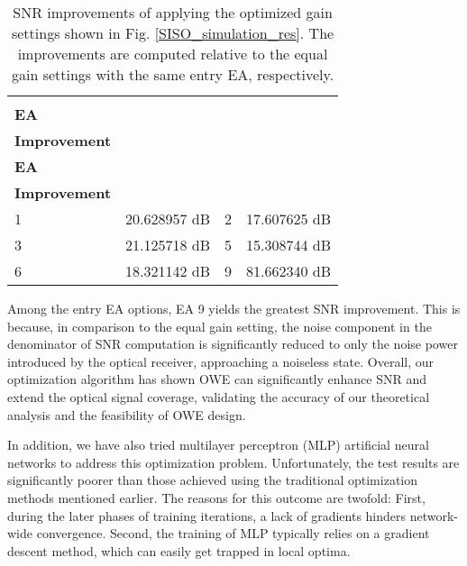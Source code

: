 \begin{table}
\centering
\begin{tabularx}{0.48\textwidth}{p{1.5cm}l|p{1.5cm}l}
\toprule
\begin{tabular}[c]{@{}l@{}} \textbf{Entry} \\ \textbf{EA} \end{tabular} & \begin{tabular}[c]{@{}l@{}} \textbf{SNR} \\ \textbf{Improvement} \quad \quad \quad \end{tabular} & \begin{tabular}[c]{@{}l@{}} \textbf{Entry} \\ \textbf{EA} \end{tabular} & \begin{tabular}[c]{@{}l@{}} \textbf{SNR} \\ \textbf{Improvement} \end{tabular} \\ \midrule
1           & 20.628957 dB    & 2           & 17.607625 dB    \\
3           & 21.125718 dB    & 5           & 15.308744 dB    \\
6           & 18.321142 dB    & 9           & 81.662340 dB    \\ \bottomrule
\end{tabularx}
\caption{SNR improvements of applying the optimized gain settings shown in Fig. \ref{SISO_simulation_res}. The improvements are computed relative to the equal gain settings with the same entry EA, respectively.}
\label{snr_improvement}
\vspace{-0.4cm}
\end{table}
\par
Among the entry EA options, EA 9 yields the greatest SNR improvement. This is because, in comparison to the equal gain setting, the noise component in the denominator of SNR computation is significantly reduced to only the noise power introduced by the optical receiver, approaching a noiseless state.
Overall, our optimization algorithm has shown OWE can significantly enhance SNR and extend the optical signal coverage, validating the accuracy of our theoretical analysis and the feasibility of OWE design.
\par
In addition, we have also tried multilayer perceptron (MLP) artificial neural networks to address this optimization problem. Unfortunately, the test results are significantly poorer than those achieved using the traditional optimization methods mentioned earlier. The reasons for this outcome are twofold: First, during the later phases of training iterations, a lack of gradients hinders network-wide convergence. Second, the training of MLP typically relies on a gradient descent method, which can easily get trapped in local optima.

